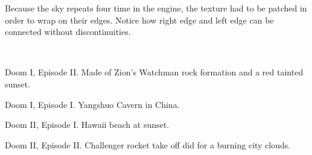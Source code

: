 Because the sky repeats four time in the engine, the texture had to be patched in order to wrap on their edges. Notice how right edge and left edge can be connected without discontinuities.\\
\par
{}\\
\par
{}





\begin{minipage}{\textwidth}
\par
Doom I, Episode II. Made of Zion's Watchman rock formation and a red tainted sunset.\\
\par
{}
\end{minipage}






\begin{minipage}{\textwidth}
\par
Doom I, Episode I. Yangshuo Cavern in China.\\
\par
{}
\end{minipage}
\par






\begin{minipage}{\textwidth}
\par
Doom II, Episode I. Hawaii beach at sunset.\\
\par
{}
\end{minipage}


\begin{minipage}{\textwidth}
\par
Doom II, Episode II. Challenger rocket take off did for a burning city clouds.\\
\par
{}
\end{minipage}







